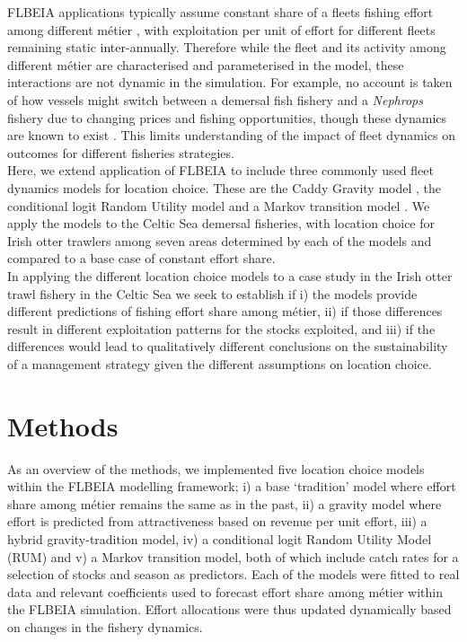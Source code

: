\documentclass[12pt, halfline, a4paper]{ouparticle}
\begin{document}
FLBEIA applications typically assume constant share of a fleets fishing effort
among different métier \citep{Ulrich2016, Garcia2020}, with exploitation per
unit of effort for different fleets remaining static inter-annually. Therefore
while the fleet and its activity among different métier are characterised and
parameterised in the model, these interactions are not dynamic in the
simulation. For example, no account is taken of how vessels might switch
between a demersal fish fishery and a \textit{Nephrops} fishery due to changing
prices and fishing opportunities, though these dynamics are known to exist
\citep{Davie2011}. This limits understanding of the impact of fleet dynamics on
outcomes for different fisheries strategies. \\ 

Here, we extend application of FLBEIA to include three commonly used fleet
dynamics models for location choice. These are the Caddy Gravity model
\citep{Caddy1975}, the conditional logit Random Utility model
\citep{McFadden1973} and a Markov transition model \citep{Venables2009}. We
apply the models to the Celtic Sea demersal fisheries, with location choice for
Irish otter trawlers among seven areas determined by each of the models and
compared to a base case of constant effort share. \\ 

In applying the different location choice models to a case study in the Irish
otter trawl fishery in the Celtic Sea we seek to establish if i) the models
provide different predictions of fishing effort share among métier, ii) if
those differences result in different exploitation patterns for the stocks
exploited, and iii) if the differences would lead to qualitatively different
conclusions on the sustainability of a management strategy given the different
assumptions on location choice. \\

\section{Methods}
\label{meth}

As an overview of the methods, we implemented five location choice models within the FLBEIA modelling
framework; i) a base `tradition' model where effort share among métier remains
the same as in the past, ii) a gravity model where effort is predicted from
attractiveness based on revenue per unit effort, iii) a hybrid
gravity-tradition model, iv) a conditional logit Random Utility Model (RUM) and
v) a Markov transition model, both of which include catch rates for a selection
of stocks and season as predictors. Each of the models were fitted to real data and
relevant coefficients used to forecast effort share among métier within the FLBEIA simulation.
Effort allocations were thus updated dynamically based on
changes in the fishery dynamics.\\
\end{document}
